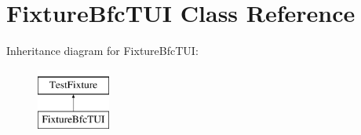 \hypertarget{classFixtureBfcTUI}{\section{Fixture\-Bfc\-T\-U\-I Class Reference}
\label{classFixtureBfcTUI}
}
Inheritance diagram for Fixture\-Bfc\-T\-U\-I\-:\begin{figure}[H]
\begin{center}
\leavevmode
\includegraphics[height=2.000000cm]{classFixtureBfcTUI}
\end{center}
\end{figure}
